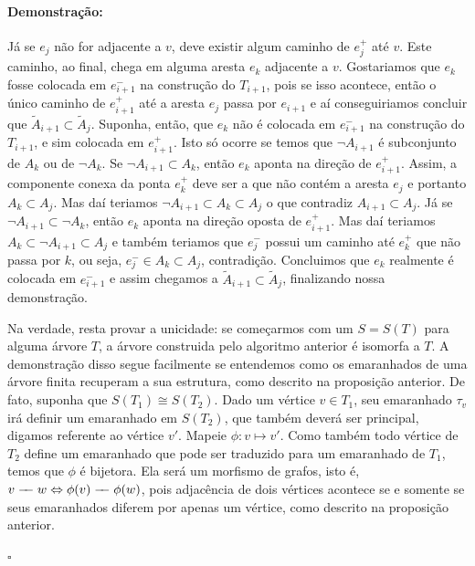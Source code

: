 \documentclass[11pt]{article}
\newcommand{\pulinho}{\vspace{.5cm}}
\newcommand{\edge}{%
  \mathrel{-}%
  \joinrel\joinrel %
  \mathrel{-}%
}
\theoremstyle{definition}
\theoremstyle{definition}
\theoremstyle{definition}
\newtheorem{prop}{Proposição}
\newenvironment{proposicao}{
\definecolor{shadecolor}{HTML}{FFDBDF}
\begin{shaded}
\begin{prop}
}
{
\end{prop}
\end{shaded}
}
\theoremstyle{definition}
\theoremstyle{definition}
\theoremstyle{definition}
\theoremstyle{definition}
\theoremstyle{definition}
\theoremstyle{definition}
\theoremstyle{definition}
\theoremstyle{definition}
\theoremstyle{definition}
\newenvironment{prova}{\paragraph{Demonstração:}}{\hfill$\square$ 
\pulinho
}
\theoremstyle{definition}
\theoremstyle{definition}
\begin{document}
\begin{prova}
Já se $e_j$ não for adjacente a $v$, deve existir algum caminho de $e_j^+$ até $v$. Este caminho, ao final, chega em alguma aresta $e_k$ adjacente a $v$. Gostariamos que $e_k$ fosse colocada em $e_{i+1}^-$ na construção do $T_{i+1}$, pois se isso acontece, então o único caminho de $e_{i+1}^+$ até a aresta $e_j$ passa por $e_{i+1}$ e aí conseguiriamos concluir que $\widetilde{A}_{i+1} \subset \tilde{A}_j$. Suponha, então, que $e_k$ não é colocada em $e_{i+1}^-$ na construção do $T_{i+1}$, e sim colocada em $e_{i+1}^+$. Isto só ocorre se temos que $\lnot A_{i+1}$ é subconjunto de $A_k$ ou de $\lnot A_k$. Se $\lnot A_{i+1} \subset A_k$, então $e_k$ aponta na direção de $e_{i+1}^+$. Assim, a componente conexa da ponta $e_k^+$ deve ser a que não contém a aresta $e_j$ e portanto $A_k \subset A_j$.  Mas daí teriamos $\lnot A_{i+1} \subset A_k \subset A_j$ o que contradiz $A_{i+1} \subset A_j$. Já se $\lnot A_{i+1} \subset \lnot A_k$, então $e_k$ aponta na direção oposta de $e_{i+1}^+$. Mas daí teriamos $A_k \subset \lnot A_{i+1} \subset A_j$ e também teriamos que $e_j^-$ possui um caminho até $e_k^+$ que não passa por $k$, ou seja, $e_j^- \in A_k \subset A_j$, contradição. Concluimos que $e_k$ realmente é colocada em $e_{i+1}^-$ e assim chegamos a $\widetilde{A}_{i+1} \subset \tilde{A}_j$, finalizando nossa demonstração.

Na verdade, resta provar a unicidade: se começarmos com um $S = S(T)$ para alguma árvore $T$, a árvore construida pelo algoritmo anterior é isomorfa a $T$. A demonstração disso segue facilmente se entendemos como os emaranhados de uma árvore finita recuperam a sua estrutura, como descrito na proposição anterior. De fato, suponha que $S(T_1) \cong S(T_2)$. Dado um vértice $v \in T_1$, seu emaranhado $\tau_v$ irá definir um emaranhado em $S(T_2)$, que também deverá ser principal, digamos referente ao vértice $v'$. Mapeie $\phi: v \mapsto v'$. Como também todo vértice de $T_2$ define um emaranhado que pode ser traduzido para um emaranhado de $T_1$, temos que $\phi$ é bijetora. Ela será um morfismo de grafos, isto é, $v \edge w \Leftrightarrow \phi(v) \edge \phi(w)$, pois adjacência de dois vértices acontece se e somente se seus emaranhados diferem por apenas um vértice, como descrito na proposição anterior. 

\end{prova}


\end{document}
